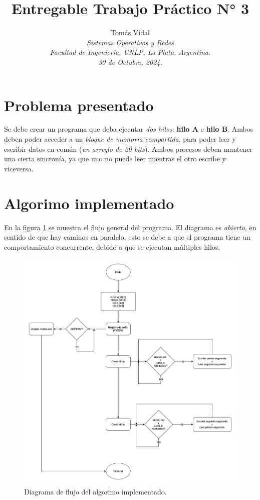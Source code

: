 \documentclass[letterpaper, 10 pt, conference]{ieeeconf}  %
\title{\LARGE \bf Entregable Trabajo Práctico N° 3}
\author{
  Tom\'as Vidal\\
  {\it Sistemas Operativos y Redes}\\
  {\it Facultad de Ingenier\'ia, UNLP, La Plata, Argentina.}\\
  {\it 30 de Octubre, 2024.}
}                                            %
\begin{document}
\maketitle
\thispagestyle{empty}
\pagestyle{empty}

\section{Problema presentado}
Se debe crear un programa que deba ejecutar \textit{dos hilos}: \textbf{hilo A} e \textbf{hilo B}. Ambos deben poder acceder a un \textit{bloque de memoria compartida}, para poder leer y escribir datos en común (\textit{un arreglo de 20 bits}). Ambos procesos deben mantener una cierta sincronía, ya que uno no puede leer mientras el otro escribe y viceversa.

\section{Algorimo implementado}
En la figura \ref{fig:diag_flujo} se muestra el flujo general del programa. El diagrama es \textit{abierto}, en sentido de que hay caminos en paralelo, esto se debe a que el programa tiene un comportamiento concurrente, debido a que se ejecutan múltiples hilos.
\begin{figure}[tb]
  \centering
  \includegraphics[width=\textwidth]{./tp3diagflujo.png}
  \caption{Diagrama de flujo del algorimo implementado.}
  \label{fig:diag_flujo}
\end{figure}
\end{document}
